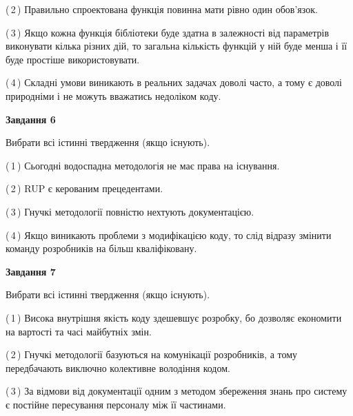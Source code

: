 \documentclass[10pt, ukrainian]{article}
\begin{document}
{\begin {large}
(\,2\,) Правильно спроектована функція повинна мати рівно один обов'язок. %



(\,3\,) Якщо кожна функція бібліотеки буде здатна в залежності від параметрів виконувати кілька різних дій, то загальна кількість функцій у ній буде менша і її буде простіше використовувати. %



(\,4\,) Складні умови виникають в реальних задачах доволі часто, а тому є доволі природніми і не можуть вважатись недоліком коду. %

\newpage

{\begin {center}\textbf{Завдання 6}\end {center}}\par
Вибрати всі істинні твердження (якщо існують).\par
\vspace{2mm}



(\,1\,) Сьогодні водоспадна методологія не має права на існування. %



(\,2\,) RUP є керованим прецедентами. %



(\,3\,) Гнучкі методології повністю нехтують документацією. %



(\,4\,) Якщо виникають проблеми з модифікацією коду, то слід відразу змінити команду розробників на більш кваліфіковану.%


{\begin {center}\textbf{Завдання 7}\end {center}}\par
Вибрати всі істинні твердження (якщо існують).\par
\vspace{2mm}



(\,1\,) Висока внутрішня якість коду здешевшує розробку, бо дозволяє економити на вартості та часі майбутніх змін. %



(\,2\,) Гнучкі методології базуються на комунікації розробників, а тому передбачають виключно колективне володіння кодом. %



(\,3\,) За відмови від документації одним з методом збереження знань про систему є постійне пересування персоналу між її частинами. %




\end{large}}
\end{document}

